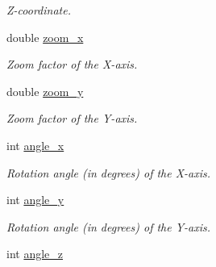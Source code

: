 \begin{DoxyCompactItemize}
\begin{DoxyCompactList}\small\item\em Z-\/coordinate. \item\end{DoxyCompactList}\item 
\hypertarget{class_f2_c_1_1_sprite_base_a9235af48d901047bec58ff47967a0448}{
double \hyperlink{class_f2_c_1_1_sprite_base_a9235af48d901047bec58ff47967a0448}{zoom\_\-x}}
\label{class_f2_c_1_1_sprite_base_a9235af48d901047bec58ff47967a0448}

\begin{DoxyCompactList}\small\item\em Zoom factor of the X-\/axis. \item\end{DoxyCompactList}\item 
\hypertarget{class_f2_c_1_1_sprite_base_a477efe5d34ffd44a7efa53886d4e6c5b}{
double \hyperlink{class_f2_c_1_1_sprite_base_a477efe5d34ffd44a7efa53886d4e6c5b}{zoom\_\-y}}
\label{class_f2_c_1_1_sprite_base_a477efe5d34ffd44a7efa53886d4e6c5b}

\begin{DoxyCompactList}\small\item\em Zoom factor of the Y-\/axis. \item\end{DoxyCompactList}\item 
\hypertarget{class_f2_c_1_1_sprite_base_abf960116205e3bfdd3931f1425573983}{
int \hyperlink{class_f2_c_1_1_sprite_base_abf960116205e3bfdd3931f1425573983}{angle\_\-x}}
\label{class_f2_c_1_1_sprite_base_abf960116205e3bfdd3931f1425573983}

\begin{DoxyCompactList}\small\item\em Rotation angle (in degrees) of the X-\/axis. \item\end{DoxyCompactList}\item 
\hypertarget{class_f2_c_1_1_sprite_base_a457087831441f94ca1bde73e7b1f9807}{
int \hyperlink{class_f2_c_1_1_sprite_base_a457087831441f94ca1bde73e7b1f9807}{angle\_\-y}}
\label{class_f2_c_1_1_sprite_base_a457087831441f94ca1bde73e7b1f9807}

\begin{DoxyCompactList}\small\item\em Rotation angle (in degrees) of the Y-\/axis. \item\end{DoxyCompactList}\item 
\hypertarget{class_f2_c_1_1_sprite_base_a5b407a83fd63a06e4fd6ab27f2086bd0}{
int \hyperlink{class_f2_c_1_1_sprite_base_a5b407a83fd63a06e4fd6ab27f2086bd0}{angle\_\-z}}
\label{class_f2_c_1_1_sprite_base_a5b407a83fd63a06e4fd6ab27f2086bd0}


\end{DoxyCompactItemize}
